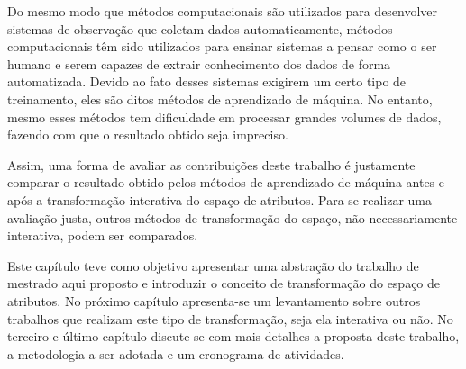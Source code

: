 Do mesmo modo que métodos computacionais são utilizados para
desenvolver sistemas de observação que coletam dados
automaticamente, métodos computacionais têm sido utilizados
para ensinar sistemas a pensar como o ser humano e serem
capazes de extrair conhecimento dos dados de forma
automatizada. Devido ao fato desses sistemas exigirem um
certo tipo de treinamento, eles são ditos métodos de
aprendizado de máquina. No entanto, mesmo esses métodos tem
dificuldade em processar grandes volumes de dados, fazendo
com que o resultado obtido seja impreciso.

Assim, uma forma de avaliar as contribuições deste trabalho
é justamente comparar o resultado obtido pelos métodos de
aprendizado de máquina antes e após a transformação
interativa do espaço de atributos. Para se realizar uma
avaliação justa, outros métodos de transformação do espaço,
não necessariamente interativa, podem ser comparados.

Este capítulo teve como objetivo apresentar uma abstração do
trabalho de mestrado aqui proposto e introduzir o conceito
de transformação do espaço de atributos. No próximo capítulo
apresenta-se um levantamento sobre outros trabalhos que
realizam este tipo de transformação, seja ela interativa ou
não. No terceiro e último capítulo discute-se com mais
detalhes a proposta deste trabalho, a metodologia a ser
adotada e um cronograma de atividades.
